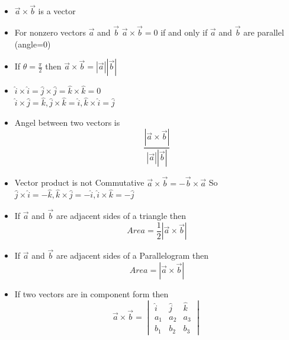 \documentclass[12pt]{article}
\begin{document}
\begin{multicols*}{2}
\begin{itemize}
    \item $\vec{a} \times \vec{b}$ is a vector 
    \item For nonzero vectors $\vec{a}$ and $\vec{b}$ $\vec{a} \times \vec{b}=0$ if and only if $\vec{a}$ and $\vec{b}$ are parallel (angle=0)
    \item If $\theta =\frac{\pi}{2}$ then $\vec{a} \times \vec{b}=|\vec{a}||\vec{b}|$
    \item $\hat{i} \times \hat{i}=\hat{j} \times \hat{j}=\hat{k} \times \hat{k}=0$ \\ $\hat{i} \times \hat{j}=\hat{k},\hat{j} \times \hat{k}= \hat{i},\hat{k} \times \hat{i}=\hat{j}$
    \item Angel between two vectors is $$\frac{|\vec{a} \times \vec{b}|}{|\vec{a}||\vec{b}|}$$
    \item Vector product is not Commutative $\vec{a} \times \vec{b}=-\vec{b} \times \vec{a}$ So $\hat{j} \times \hat{i}=-\hat{k},\hat{k} \times \hat{j}=-\hat{i},\hat{i} \times \hat{k}=-\hat{j}$
    \item If $\vec{a}$ and $\vec{b}$ are adjacent sides of a triangle then $$Area =\frac{1}{2} |\vec{a} \times \vec{b}|$$
    \item If $\vec{a}$ and $\vec{b}$ are adjacent sides of a Parallelogram then $$Area = |\vec{a} \times \vec{b}|$$
    \item If two vectors are in component form then $$\vec{a} \times \vec{b}=\begin{vmatrix}
        \hat{i} & \hat{j} & \hat{k} \\
        a_1 & a_2 & a_3 \\
        b_1 & b_2 & b_3
    \end{vmatrix}$$

\end{itemize}










\end{multicols*}
\end{document}
